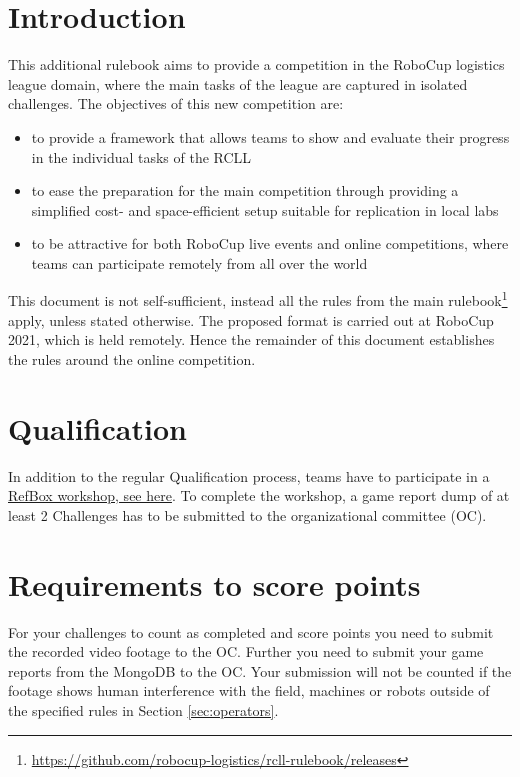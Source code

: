\documentclass[12pt,twoside]{article}
\begin{document}
\section{Introduction}
\label{sec:intro}
This additional rulebook aims to provide a competition in the RoboCup logistics
league domain, where the main tasks of the league are captured in isolated
challenges.
The objectives of this new competition are:
\begin{itemize}
 \item to provide a framework that allows teams to show and evaluate their
       progress in the individual tasks of the RCLL
 \item to ease the preparation for the main competition through providing a
       simplified cost- and space-efficient setup suitable for replication in
       local labs
 \item to be attractive for both RoboCup live events and online competitions,
       where teams can participate remotely from all over the world
\end{itemize}
This document is not self-sufficient, instead all the rules from the main
rulebook\footnote{\url{https://github.com/robocup-logistics/rcll-rulebook/releases}}
apply, unless stated otherwise.
The proposed format is carried out at RoboCup 2021, which is held remotely.
Hence the remainder of this document establishes the rules around the online
competition.

\section{Qualification}
\label{sec:qualification}
In addition to the regular Qualification process, teams have to participate
in a \href{https://fh-aachen.sciebo.de/s/Qkm7VfIIEIIJk1d}{RefBox workshop, see here}.
To complete the workshop, a game report dump of at least 2 Challenges
has to be submitted to the organizational committee (OC).

\section{Requirements to score points}
\label{sec:scoring}
For your challenges to count as completed and score points you need to submit
the recorded video footage to the OC.
Further you need to submit your game reports from the MongoDB to the OC.
Your submission will not be counted if the footage shows human
interference with the field, machines or robots outside of
the specified rules in Section \ref{sec:operators}.
\end{document}
